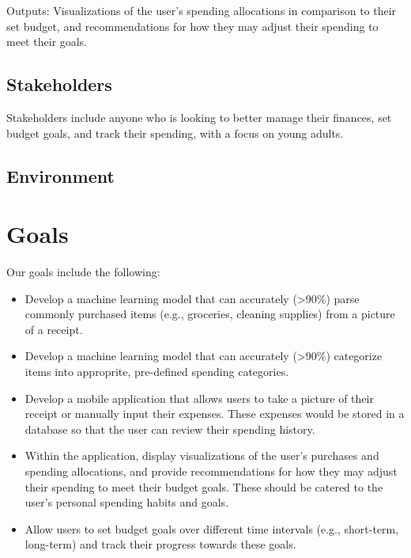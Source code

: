 \documentclass{article}
\begin{document}
Outputs: Visualizations of the user's spending allocations in comparison to their set budget, and recommendations for how they may adjust their spending to meet their goals.

\subsection{Stakeholders}

Stakeholders include anyone who is looking to better manage their finances, set budget goals, and track their spending, with a focus on young adults.

\subsection{Environment}


\section{Goals}

Our goals include the following:
\begin{itemize}
    \item Develop a machine learning model that can accurately (\textgreater90\%) parse commonly purchased items (e.g., groceries, cleaning supplies) from a picture of a receipt.
    \item Develop a machine learning model that can accurately (\textgreater90\%) categorize items into approprite, pre-defined spending categories. 
    \item Develop a mobile application that allows users to take a picture of their receipt or manually input their expenses. These expenses would be stored in a database so that the user can review their spending history.
    \item Within the application, display visualizations of the user's purchases and spending allocations, and provide recommendations for how they may adjust their spending to meet their budget goals. These should be catered to the user's personal spending habits and goals.
    \item Allow users to set budget goals over different time intervals (e.g., short-term, long-term) and track their progress towards these goals.
\end{itemize}
\end{document}
